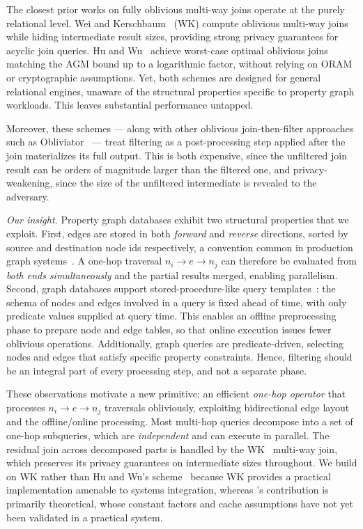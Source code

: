 The closest prior works on fully oblivious multi-way joins operate at the
purely relational level. Wei and Kerschbaum~\cite{ruidi2025oblivious} (WK) 
compute oblivious multi-way joins while hiding intermediate result sizes, 
providing strong privacy guarantees for acyclic join queries. Hu and 
Wu~\cite{hu2025optimal} achieve worst-case optimal oblivious joins matching the 
AGM bound up to a logarithmic factor, without relying on ORAM or cryptographic 
assumptions. Yet, both schemes are designed for general relational engines,
unaware of the structural properties specific to 
property graph workloads. This leaves substantial performance untapped.

Moreover, these schemes --- along with other oblivious join-then-filter 
approaches such as Obliviator~\cite{mavrogiannakis2025obliviator} --- treat 
filtering as a post-processing step applied after the join materializes its 
full output. This is both expensive, since the unfiltered join result can be 
orders of magnitude larger than the filtered one, and privacy-weakening, since 
the size of the unfiltered intermediate is revealed to the adversary.

\emph{Our insight.} Property graph databases exhibit two structural properties 
that we exploit. First, edges are stored in 
both \emph{forward} and \emph{reverse} directions, sorted by source and 
destination node ids respectively, a convention common in production graph 
systems~\cite{janusgraph, feng2023kuzu, deutsch2019tigergraph, 
sun2015sqlgraph}. A one-hop traversal $n_i \rightarrow e \rightarrow n_j$ can 
therefore be evaluated from \emph{both ends simultaneously} and the partial 
results merged, enabling parallelism. Second, graph 
databases support stored-procedure-like query 
templates~\cite{deutsch2019tigergraph, neo4j, janusgraph, bebee2018amazon}: 
the schema of nodes and edges involved in a query is fixed ahead of time, with 
only predicate values supplied at query time. This enables an offline 
preprocessing phase to prepare node and edge tables, so that online 
execution issues fewer oblivious operations.
Additionally, graph queries are predicate-driven, selecting nodes 
and edges that satisfy specific property constraints. Hence, filtering should 
be an integral part of every processing step, and not a separate phase. 


These observations motivate a new primitive: an efficient \emph{one-hop 
operator} that processes $n_i \rightarrow e \rightarrow n_j$ traversals 
obliviously, exploiting bidirectional edge layout and the offline/online 
processing. Most multi-hop queries decompose into a set of one-hop 
subqueries, which are \emph{independent} and can execute in parallel. The 
residual join across decomposed parts is handled by the WK~\cite{ruidi2025oblivious} multi-way join, 
which preserves its privacy guarantees on intermediate sizes throughout.
We 
build on WK rather than Hu and Wu's scheme~\cite{hu2025optimal} because WK provides a practical 
implementation amenable to systems integration, whereas \cite{hu2025optimal}'s 
contribution is primarily theoretical, whose 
constant factors and cache assumptions have not yet been validated in a 
practical system.

